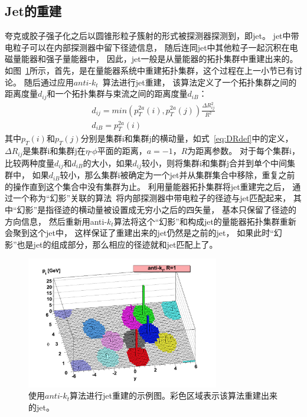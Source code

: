 \subsection{Jet的重建}
\label{sec:JET}

夸克或胶子强子化之后以圆锥形粒子簇射的形式被探测器探测到，即jet。
jet中带电粒子可以在内部探测器中留下径迹信息，
随后连同jet中其他粒子一起沉积在电磁量能器和强子量能器中，
因此，jet一般是从量能器的拓扑集群中重建出来的。
如图~\ref{fig:ATLASJET1}所示，首先，是在量能器系统中重建拓扑集群，这个过程在上一小节已有讨论。
随后通过应用$anti$-$k_t$~\cite{ANTIKT}算法进行jet重建，
该算法定义了一个拓扑集群之间的距离度量$d_{ij}$和一个拓扑集群与束流之间的距离度量$d_{iB}$：
\begin{equation} 
\label{eq:TOPOSN}
\begin{aligned}
d_{ij}=min\left( p_T^{2a}(i),p_T^{2a}(j) \right)\frac{\Delta R_{ij}^2}{R^2}
\\
d_{iB}=p_T^{2a}(i)
 \end{aligned}
\end{equation}
其中$p_{T}(i)$和$p_{T}(j)$分别是集群i和集群j的横动量，如式~\ref{eq:DRdef}中的定义，$\Delta R_{ij}$是集群i和集群j在$\eta$-$\phi$平面的距离，$a=-1$，$R$为距离参数。
对于每个集群i，比较两种度量$d_{ij}$和$d_{iB}$的大小，如果$d_{ij}$较小，则将集群i和集群j合并到单个中间集群中，
如果$d_{iB}$较小，那么集群i被确定为一个jet并从集群集合中移除，重复之前的操作直到这个集合中没有集群为止。
利用量能器拓扑集群将jet重建完之后，
通过一个称为“幻影”关联的算法~\cite{Cacciari:2008gn}将内部探测器中带电粒子的径迹与jet匹配起来，
其中“幻影”是指径迹的横动量被设置成无穷小之后的四矢量，
基本只保留了径迹的方向信息，
然后重新用anti-$k_t$算法将这个“幻影”和构成jet的量能器拓扑集群重新会聚到这个jet中，
这样保证了重建出来的jet仍然是之前的jet，
如果此时“幻影”也是jet的组成部分，那么相应的径迹就和jet匹配上了。


\begin{figure}
 \begin{center}
    \includegraphics[width=0.75\textwidth]{figuresEXP/ATLASJET1.jpg}
  \end{center}
  \caption{
使用$anti$-$k_t$算法进行jet重建的示例图。彩色区域表示该算法重建出来的jet。
  }
    \label{fig:ATLASJET1}
\end{figure}



